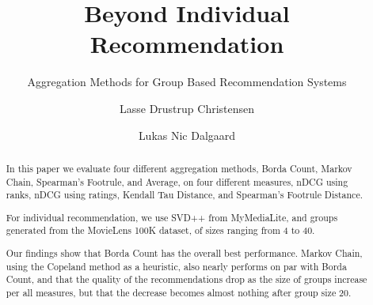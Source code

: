 \documentclass[sigplan]{acmart}
\begin{document}
\title{Beyond Individual Recommendation}
\subtitle{Aggregation Methods for Group Based Recommendation Systems}

\author{Lasse Drustrup Christensen}

\author{Lukas Nic Dalgaard}



\begin{abstract}
In this paper we evaluate four different aggregation methods, Borda Count, Markov Chain, Spearman's Footrule, and Average, on four different measures, nDCG using ranks, nDCG using ratings, Kendall Tau Distance, and Spearman's Footrule Distance.
	
For individual recommendation, we use SVD++ from MyMediaLite, and groups generated from the MovieLens 100K dataset, of sizes ranging from 4 to 40.
	
Our findings show that Borda Count has the overall best performance. Markov Chain, using the Copeland method as a heuristic, also nearly performs on par with Borda Count, and that the quality of the recommendations drop as the size of groups increase per all measures, but that the decrease becomes almost nothing after group size 20.
%
\end{abstract}
\end{document}
